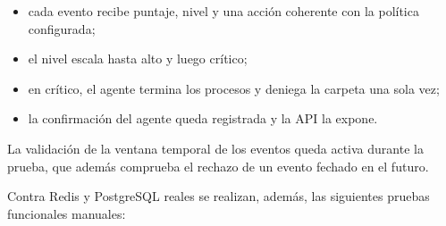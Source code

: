 \begin{itemize}
	\item cada evento recibe puntaje, nivel y una acción coherente con la política configurada;
	\item el nivel escala hasta alto y luego crítico;
	\item en crítico, el agente termina los procesos y deniega la carpeta una sola vez;
	\item la confirmación del agente queda registrada y la API la expone.
\end{itemize}
La validación de la ventana temporal de los eventos queda activa durante la prueba, que además comprueba el rechazo de un evento fechado en el futuro.

Contra Redis y PostgreSQL reales se realizan, además, las siguientes pruebas funcionales manuales:

